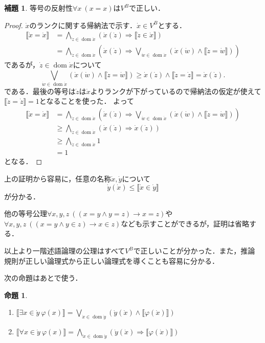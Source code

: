 \documentclass[uplatex,dvipdfmx]{jsarticle}
\newcommand{\dom}{\operatorname{dom}}
\newcommand{\truth}[1] {\llbracket #1 \rrbracket}
\theoremstyle{definition}
\newtheorem{lem}[thm]{補題}
\newtheorem{prop}[thm]{命題}
\begin{document}
\begin{lem}
等号の反射性$\forall x\ (x = x)$は$V^B$で正しい．
\end{lem}
\begin{proof}
$\dot{x}$のランクに関する帰納法で示す．$\dot{x} \in V^B$とする．
\begin{align*}
\truth{\dot{x} = \dot{x}} &= \bigwedge_{\dot{z} \in \dom \dot{x}} (\dot{x}(\dot{z}) \Rightarrow \truth{\dot{z} \in \dot{x}}) \\
&= \bigwedge_{\dot{z} \in \dom \dot{x}} (\dot{x}(\dot{z}) \Rightarrow \bigvee_{\dot{w} \in \dom \dot{x}} (\dot{x}(\dot{w}) \land \truth{\dot{z} = \dot{w}}))
\end{align*}
であるが，$\dot{z} \in \dom \dot{x}$について
\[
\bigvee_{\dot{w} \in \dom \dot{x}} (\dot{x}(\dot{w}) \land \truth{\dot{z} = \dot{w}}) \ge \dot{x}(\dot{z}) \land \truth{\dot{z} = \dot{z}} = \dot{x}(\dot{z}).
\]
である．最後の等号は$\dot{z}$は$\dot{x}$よりランクが下がっているので帰納法の仮定が使えて$\truth{\dot{z} = \dot{z}} = 1$となることを使った．
よって
\begin{align*}
\truth{\dot{x} = \dot{x}} &= \bigwedge_{\dot{z} \in \dom \dot{x}} (\dot{x}(\dot{z}) \Rightarrow \bigvee_{\dot{w} \in \dom \dot{x}} (\dot{x}(\dot{w}) \land \truth{\dot{z} = \dot{w}})) \\
&\ge \bigwedge_{\dot{z} \in \dom \dot{x}} (\dot{x}(\dot{z}) \Rightarrow \dot{x}(\dot{z})) \\
&\ge \bigwedge_{\dot{z} \in \dom \dot{x}} 1 \\
&= 1
\end{align*}
となる．
\end{proof}

上の証明から容易に，任意の名称$\dot{x}, \dot{y}$について
\[
\dot{y}(\dot{x}) \le \truth{\dot{x} \in \dot{y}} 
\]
が分かる．

他の等号公理$\forall x, y, z\ ((x = y \land y = z) \to x = z)$や$\forall x, y, z\ ((x = y \land y \in z) \to x \in z)$なども示すことができるが，証明は省略する．

以上より一階述語論理の公理はすべて$V^B$で正しいことが分かった．また，推論規則が正しい論理式から正しい論理式を導くことも容易に分かる．

次の命題はあとで使う．
\begin{prop}
\begin{enumerate}
    \item $\truth{\exists x \in \dot{y}\ \varphi(x)} = \bigvee_{\dot{x} \in \dom \dot{y}} (\dot{y}(\dot{x}) \land \truth{\varphi(\dot{x})})$
    \item $\truth{\forall x \in \dot{y}\ \varphi(x)} = \bigwedge_{\dot{x} \in \dom \dot{y}} (\dot{y}(\dot{x}) \Rightarrow \truth{\varphi(\dot{x})})$
\end{enumerate}
\end{prop}
\end{document}
